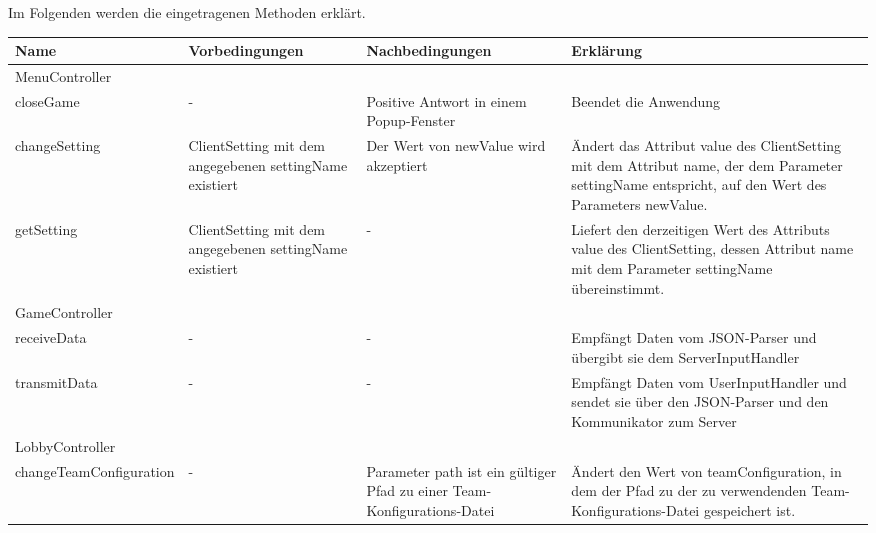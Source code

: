 	Im Folgenden werden die eingetragenen Methoden erklärt.
\begin{center}
	\begin{tabular}{|p{4.7cm}|p{3.5cm}|p{3.5cm}|p{4.3cm}|}
		\hline
		\textbf{Name} & \textbf{Vorbedingungen} & \textbf{Nachbedingungen} & \textbf{Erklärung}\\\hline
		\multicolumn{4}{|l|}{MenuController} \\\hline
		closeGame & - & Positive Antwort in einem Popup-Fenster & Beendet die Anwendung\\\hline
		changeSetting & ClientSetting mit dem angegebenen settingName existiert & Der Wert von newValue wird akzeptiert & Ändert das Attribut value des ClientSetting mit dem Attribut name, der dem Parameter settingName entspricht, auf den Wert des Parameters newValue.\\\hline
		getSetting& ClientSetting mit dem angegebenen settingName existiert & - & Liefert den derzeitigen Wert des Attributs value des ClientSetting, dessen Attribut name mit dem Parameter settingName übereinstimmt.\\\hline
		\multicolumn{4}{|l|}{GameController} \\\hline
		receiveData & - & - & Empfängt Daten vom JSON-Parser und übergibt sie dem ServerInputHandler\\\hline
		transmitData & - & - & Empfängt Daten vom UserInputHandler und sendet sie über den JSON-Parser und den Kommunikator zum Server\\\hline
		\multicolumn{4}{|l|}{LobbyController} \\\hline
		changeTeamConfiguration & - & Parameter path ist ein gültiger Pfad zu einer Team-Konfigurations-Datei & Ändert den Wert von teamConfiguration, in dem der Pfad zu der zu verwendenden Team-Konfigurations-Datei gespeichert ist.\\\hline
		
	\end{tabular}
	

\end{center}
